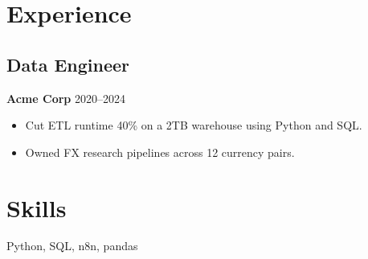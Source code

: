 \documentclass{article}
\begin{document}
\section{Experience}
\subsection{Data Engineer}
\textbf{Acme Corp} 2020--2024
\begin{itemize}
\item Cut ETL runtime 40\% on a 2TB warehouse using Python and SQL.
\item Owned FX research pipelines across 12 currency pairs.
\end{itemize}
\section{Skills}
Python, SQL, n8n, pandas
\end{document}
